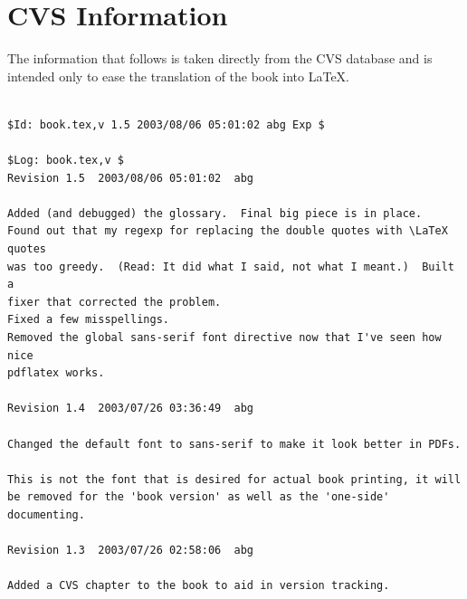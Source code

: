 \documentclass[oneside]{book}
\begin{document}
\chapter{CVS Information}
The information that follows is taken directly from the CVS database and 
is intended only to ease the translation of the book into \LaTeX.
\begin{verbatim}

$Id: book.tex,v 1.5 2003/08/06 05:01:02 abg Exp $

$Log: book.tex,v $
Revision 1.5  2003/08/06 05:01:02  abg

Added (and debugged) the glossary.  Final big piece is in place.
Found out that my regexp for replacing the double quotes with \LaTeX quotes
was too greedy.  (Read: It did what I said, not what I meant.)  Built a
fixer that corrected the problem.
Fixed a few misspellings.
Removed the global sans-serif font directive now that I've seen how nice
pdflatex works.

Revision 1.4  2003/07/26 03:36:49  abg

Changed the default font to sans-serif to make it look better in PDFs.

This is not the font that is desired for actual book printing, it will
be removed for the 'book version' as well as the 'one-side' documenting.

Revision 1.3  2003/07/26 02:58:06  abg

Added a CVS chapter to the book to aid in version tracking.


\end{verbatim}
\end{document}
